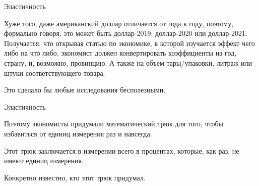 \documentclass{beamer}
\begin{document}
\begin{frame}{Эластичность}

Хуже того, даже американский доллар отличается от года к году, поэтому, формально говоря, это может быть доллар-2019, доллар-2020 или доллар-2021. Получается, что открывая статью по экономике, в которой изучается эффект чего либо на что либо, экономист должен конвертировать коэффициенты на год, страну, и, возможно, провинцию. А также на объем тары/упаковки, литраж или штуки соответствующего товара. 

Это сделало бы любые исследования бесполезными.

\end{frame}

\begin{frame}{Эластичность}

Поэтому экономисты придумали математический трюк для того, чтобы избавиться от единиц измерения раз и навсегда. 

Этот трюк заключается в измерении всего в процентах, которые, как раз, не имеют единиц измерения.

Конкретно известно, кто этот трюк придумал.

\end{frame}
\end{document}
